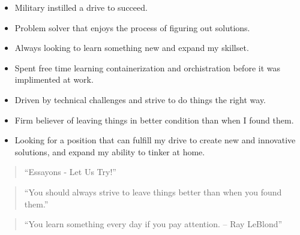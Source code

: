 \documentclass[10pt,a4paper,ragged2e,withhyper]{altacv}
\begin{document}
\begin{paracol}{2}
\medskip


\begin{itemize}
\item Military instilled a drive to succeed. 
\item Problem solver that enjoys the process of figuring out solutions. 
\item Always looking to learn something new and expand my skillset.
\item Spent free time learning containerization and orchistration before it was implimented at work.
\item Driven by technical challenges and strive to do things the right way. 
\item Firm believer of leaving things in better condition than when I found them. 
\item Looking for a position that can fulfill my drive to create new and innovative solutions, and expand my ability to tinker at home.
\end{itemize}

\switchcolumn


\begin{quote}
  ``Essayons - Let Us Try!''
  \end{quote}  

  \divider

\begin{quote}
``You should always strive to leave things better than when you found them.''
\end{quote}

\divider

\begin{quote}
  ``You learn something every day if you pay attention. -- Ray LeBlond''
  \end{quote}



\divider


\divider




\end{paracol}
\end{document}
